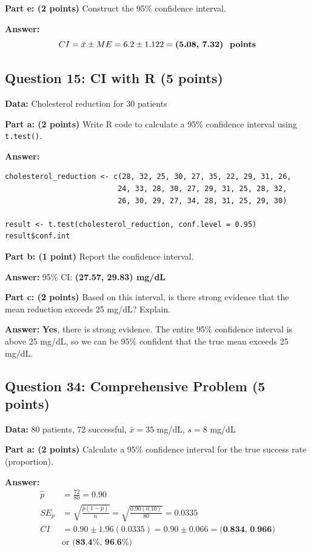 \documentclass[11pt]{article}
\begin{document}
\textbf{Part e: (2 points)} Construct the 95\% confidence interval.

\textcolor{correctgreen}{\textbf{Answer:}}
$$CI = \bar{x} \pm ME = 6.2 \pm 1.122 = \textbf{(5.08, 7.32) \text{ points}}$$

\vspace{1cm}

\subsection*{Question 15: CI with R (5 points)}

\textbf{Data:} Cholesterol reduction for 30 patients

\textbf{Part a: (2 points)} Write R code to calculate a 95\% confidence interval using \texttt{t.test()}.

\textcolor{correctgreen}{\textbf{Answer:}}
\begin{verbatim}
cholesterol_reduction <- c(28, 32, 25, 30, 27, 35, 22, 29, 31, 26,
                          24, 33, 28, 30, 27, 29, 31, 25, 28, 32,
                          26, 30, 29, 27, 34, 28, 31, 25, 29, 30)

result <- t.test(cholesterol_reduction, conf.level = 0.95)
result$conf.int
\end{verbatim}

\textbf{Part b: (1 point)} Report the confidence interval.

\textcolor{correctgreen}{\textbf{Answer:}} 95\% CI: \textbf{(27.57, 29.83) mg/dL}

\textbf{Part c: (2 points)} Based on this interval, is there strong evidence that the mean reduction exceeds 25 mg/dL? Explain.

\textcolor{correctgreen}{\textbf{Answer:}} \textbf{Yes}, there is strong evidence. The entire 95\% confidence interval is above 25 mg/dL, so we can be 95\% confident that the true mean exceeds 25 mg/dL.

\newpage

\subsection*{Question 34: Comprehensive Problem (5 points)}

\textbf{Data:} 80 patients, 72 successful, $\bar{x} = 35$ mg/dL, $s = 8$ mg/dL

\textbf{Part a: (2 points)} Calculate a 95\% confidence interval for the true success rate (proportion).

\textcolor{correctgreen}{\textbf{Answer:}}
\begin{align*}
\hat{p} &= \frac{72}{80} = 0.90\\
SE_p &= \sqrt{\frac{\hat{p}(1-\hat{p})}{n}} = \sqrt{\frac{0.90(0.10)}{80}} = 0.0335\\
CI &= 0.90 \pm 1.96(0.0335) = 0.90 \pm 0.066 = \textbf{(0.834, 0.966)}\\
&\text{or } \textbf{(83.4\%, 96.6\%)}
\end{align*}
\end{document}
